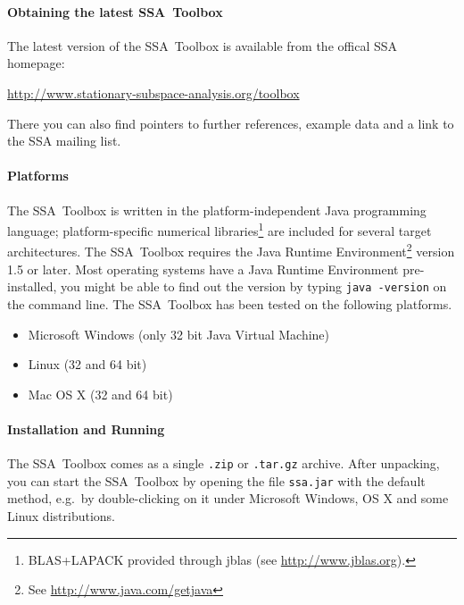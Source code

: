 \documentclass{article}
\newcommand{\1}{\ensuremath{\mathds{1}}}
\newcommand{\0}{\ensuremath{0}}
\begin{document}
\paragraph{Obtaining the latest SSA~Toolbox}

The latest version of the SSA~Toolbox is available from the offical SSA homepage: 
\begin{center}
	\url{http://www.stationary-subspace-analysis.org/toolbox}
\end{center}
There you can also find pointers to further references, example data and a link 
to the SSA mailing list. 

\paragraph{Platforms}

The SSA~Toolbox is written in the platform-independent Java programming language; 
platform-specific numerical libraries\footnote{BLAS+LAPACK provided through
jblas (see \url{http://www.jblas.org}).} are included for several target architectures. 
The SSA~Toolbox requires the Java Runtime Environment\footnote{See 
\url{http://www.java.com/getjava}} version 1.5 or later. Most operating systems
have a Java Runtime Environment pre-installed, you might be able to find out 
the version by typing \texttt{java -version} on the command line. The SSA~Toolbox has 
been tested on the following platforms.
\begin{itemize}
	\item Microsoft Windows (only 32 bit Java Virtual Machine)
	\item Linux (32 and 64 bit)
	\item Mac OS X (32 and 64 bit)
\end{itemize}

\paragraph{Installation and Running}

The SSA~Toolbox comes as a single \texttt{.zip} or \texttt{.tar.gz} archive. 
After unpacking, you can start the SSA~Toolbox by opening the file \texttt{ssa.jar}
with the default method, e.g.~by double-clicking on it under Microsoft Windows, 
OS X and some Linux distributions.
\end{document}
